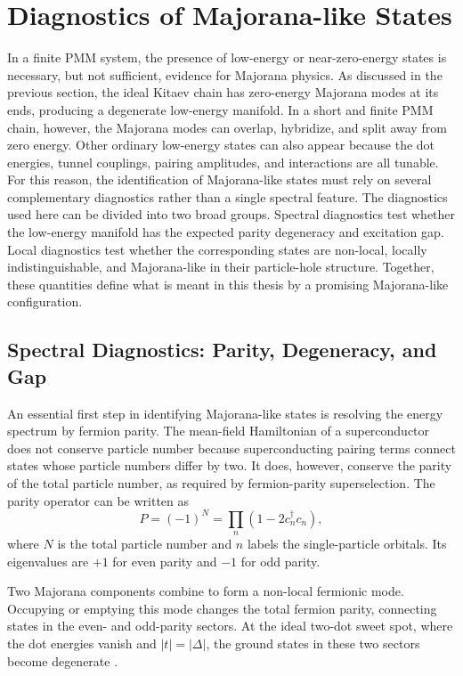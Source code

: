 \section{Diagnostics of Majorana-like States}
In a finite PMM system, the presence of low-energy or near-zero-energy states is necessary, but not sufficient, evidence for Majorana physics. As discussed in the previous section, the ideal Kitaev chain has zero-energy Majorana modes at its ends, producing a degenerate low-energy manifold. In a short and finite PMM chain, however, the Majorana modes can overlap, hybridize, and split away from zero energy. Other ordinary low-energy states can also appear because the dot energies, tunnel couplings, pairing amplitudes, and interactions are all tunable.\\

For this reason, the identification of Majorana-like states must rely on several complementary diagnostics rather than a single spectral feature. The diagnostics used here can be divided into two broad groups. Spectral diagnostics test whether the low-energy manifold has the expected parity degeneracy and excitation gap. Local diagnostics test whether the corresponding states are non-local, locally indistinguishable, and Majorana-like in their particle-hole structure. Together, these quantities define what is meant in this thesis by a promising Majorana-like configuration.\\



\subsection{Spectral Diagnostics: Parity, Degeneracy, and Gap}
\label{sec:theory-parity-resolved-spectrum}
An essential first step in identifying Majorana-like states is resolving the
energy spectrum by fermion parity. The mean-field Hamiltonian of a
superconductor does not conserve particle number because superconducting
pairing terms connect states whose particle numbers differ by two. It does,
however, conserve the parity of the total particle number, as required by fermion-parity superselection. The parity operator
can be written as
\[
P = (-1)^{N} = \prod_n (1 - 2c_n^\dagger c_n),
\]
where $N$ is the total particle number and $n$ labels the single-particle
orbitals. Its eigenvalues are $+1$ for even parity and $-1$ for odd parity.

Two Majorana components combine to form a non-local fermionic mode. Occupying
or emptying this mode changes the total fermion parity, connecting states in
the even- and odd-parity sectors. At the ideal two-dot sweet spot, where the
dot energies vanish and $|t|=|\Delta|$, the ground states in these two sectors
become degenerate
\cite{dvirRealizationMinimalKitaev2023,topocondmatKitaevChain,leijnseParityQubitsPoor2012}.

